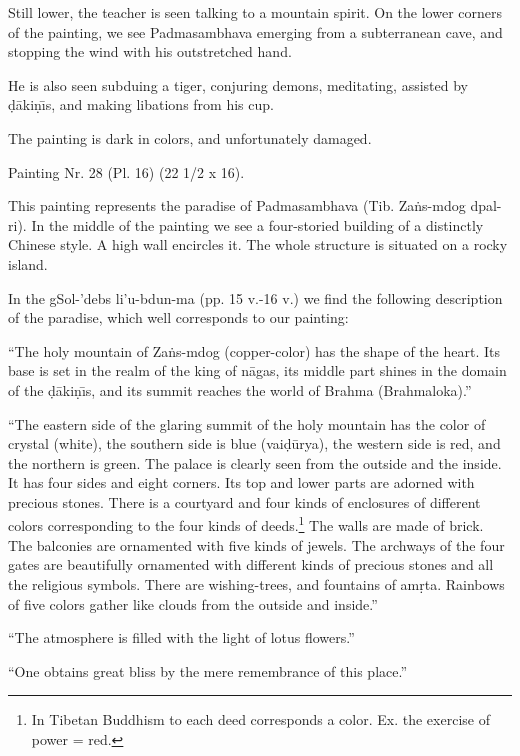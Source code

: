 \documentclass[a4paper, 12pt, oneside]{article}
\begin{document}
Still lower, the teacher is seen talking to a mountain spirit. On the lower corners of the painting, we see Padmasambhava emerging from a subterranean cave, and stopping the wind with his outstretched hand.

He is also seen subduing a tiger, conjuring demons, meditating, assisted by \d{d}\={a}ki\d{n}\={\i}s, and making libations from his cup.

The painting is dark in colors, and unfortunately damaged.

\bigskip

Painting Nr. 28 (Pl. 16) (22 1/2 x 16).

\bigskip

This painting represents the paradise of Padmasambhava (Tib. Za\.{n}s-mdog dpal-ri). In the middle of the painting we see a four-storied building of a distinctly Chinese style. A high wall encircles it. The whole structure is situated on a rocky island.

In the gSol-'debs li'u-bdun-ma (pp. 15 v.-16 v.) we find the following description of the paradise, which well corresponds to our painting:

``The holy mountain of Za\.{n}s-mdog (copper-color) has the shape of the heart. Its base is set in the realm of the king of n\={a}gas, its middle part shines in the domain of the \d{d}\={a}ki\d{n}\={\i}s, and its summit reaches the world of Brahma (Brahmaloka).''

``The eastern side of the glaring summit of the holy mountain has the color of crystal (white), the southern side is blue (vai\d{d}\={u}rya), the western side is red, and the northern is green. The palace is clearly seen from the outside and the inside. It has four sides and eight corners. Its top and lower parts are adorned with precious stones. There is a courtyard and four kinds of enclosures of different colors corresponding to the four kinds of deeds.\footnote{In Tibetan Buddhism to each deed corresponds a color. Ex. the exercise of power = red.} The walls are made of brick. The balconies are ornamented with five kinds of jewels. The  archways of the four gates are beautifully ornamented with different kinds of precious stones and all the religious symbols. There are wishing-trees, and fountains of am\d{r}ta. Rainbows of five colors gather like clouds from the outside and inside.''

``The atmosphere is filled with the light of lotus flowers.''

``One obtains great bliss by the mere remembrance of this place.''
\end{document}
